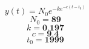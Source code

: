 \documentclass[border=0pt,varwidth,fleqn]{standalone}
\begin{document}
 
\huge
\[
    y(t) = N_0 e^{-k e^{-c (t - t_0)}}
\]
\large
\[
    N_0 = \textbf{89}
\]
\[
    k = \textbf{0.197}
\]
\[
    c = \textbf{9.4}
\]
\[
    t_0 = \textbf{1999}
\]
\end{document}
